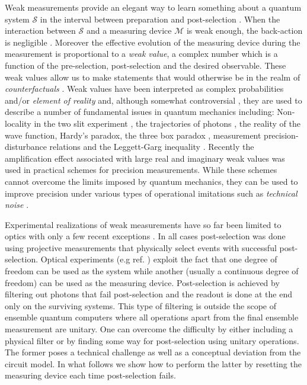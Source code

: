 \documentclass[aps,pra,12pt,onecolumn,showpacs,superscriptaddress,floatfix,footinbib,subfigure]{revtex4}
\def\es{{\mathcal{S}}}
\def\md{{\mathcal{M}}}
\begin{document}
Weak measurements provide an elegant way to learn something about a quantum system $\es$  in the interval between preparation and post-selection \cite{Aharonov1991}. When the interaction between $\es$ and a measuring device $\md$ is weak enough, the back-action is negligible \cite{Tollaksen2010}. Moreover the effective evolution of the measuring device during the measurement is proportional to a \emph{weak value}, a complex number which is a function of the pre-selection, post-selection and the desired observable. These weak values allow us to make statements that would otherwise be in the realm of \emph{counterfactuals} \cite{Aharonov2002,Molmer2001}. Weak values have been interpreted  as complex probabilities \cite{Hofmann2013} and/or  \emph{element of reality} \cite{Vaidman1996} and, although somewhat controversial \cite{Peres1989, Aharonov1989, Leggett1989}, they are  used to describe  a number of fundamental issues in quantum mechanics including: Non-locality in the two slit experiment \cite{Tollaksen2010}, the trajectories of photons  \cite{Kocsis2011}, the reality of the wave function\cite{Lundeen2011}, Hardy's paradox\cite{Aharonov2002,Molmer2001,Lundeen2009}, the three box paradox \cite{Aharonov1991,Vaidman1996,Resch2004},   measurement precision-disturbance relations  \cite{Rozema2012,Lund2010} and the Leggett-Garg inequality \cite{Goggin2011,Williams2008,Groen2013}.  Recently the amplification effect associated with large real and imaginary weak values was  used in   practical schemes for precision measurements.  While these schemes  cannot  overcome the limits imposed by quantum mechanics, they can be used to improve precision under  various types of operational imitations  such as \emph{technical noise} \cite{Jordan2013}.

Experimental realizations of weak measurements  have so far been limited to optics with only a few recent exceptions  \cite{Shomroni2013, Groen2013}. In all cases post-selection was done using projective measurements that physically select events with successful  post-selection.  Optical experiments (e.g ref. \cite{Ritchie1991}) exploit the fact that one degree of freedom can be used as the system while another (usually a continuous degree of freedom) can be used as the measuring device.  Post-selection is  achieved  by filtering out photons that fail post-selection and the readout is done at the end only on the surviving systems. This type of filtering is outside the scope of ensemble quantum computers where all operations apart from the final ensemble measurement are unitary. One can overcome the difficulty by either  including a physical filter or by finding some way for post-selection using unitary operations. The former poses a technical challenge  as well as a conceptual deviation from the circuit model. In what follows we show how to perform the latter by resetting the measuring device each time post-selection fails.
\end{document}
